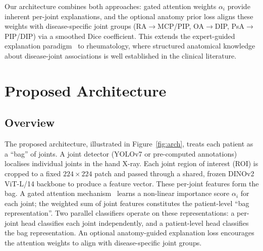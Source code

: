 \documentclass{article}
\begin{document}
Our architecture combines both approaches: gated attention weights $\alpha_i$ provide inherent per-joint explanations, and the optional anatomy prior loss aligns these weights with disease-specific joint groups (RA$\rightarrow$MCP/PIP, OA$\rightarrow$DIP, PsA$\rightarrow$PIP/DIP) via a smoothed Dice coefficient. This extends the expert-guided explanation paradigm~\cite{uddin2025} to rheumatology, where structured anatomical knowledge about disease-joint associations is well established in the clinical literature.

\section{Proposed Architecture}
\label{sec:method}

\subsection{Overview}

The proposed architecture, illustrated in Figure~\ref{fig:arch}, treats each patient as a ``bag'' of joints. A joint detector (YOLOv7 or pre-computed annotations) localises individual joints in the hand X-ray. Each joint region of interest (ROI) is cropped to a fixed $224\times224$ patch and passed through a shared, frozen DINOv2 ViT-L/14 backbone to produce a feature vector. These per-joint features form the bag. A gated attention mechanism~\cite{ilse2018} learns a non-linear importance score $\alpha_i$ for each joint; the weighted sum of joint features constitutes the patient-level ``bag representation''. Two parallel classifiers operate on these representations: a per-joint head classifies each joint independently, and a patient-level head classifies the bag representation. An optional anatomy-guided explanation loss encourages the attention weights to align with disease-specific joint groups.
\end{document}
